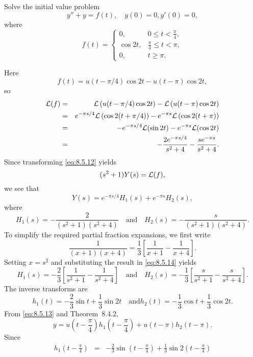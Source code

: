\documentclass{ximera}
\begin{document}
\begin{example}\label{example:8.5.4}
 Solve the initial value problem
\begin{equation}\label{eq:8.5.12}
y''+y=f(t), \quad   y(0)=0,  y'(0)=0,
\end{equation}
where
$$
f(t)=\left\{\begin{array}{cl}
 0,&0\leq t<\frac{\pi}{4},\\
\cos2t,&\frac{\pi}{4}\leq t<\pi,\\
 0,&t\geq\pi.
\end{array}\right.
$$
\begin{explanation}
Here
$$
f(t)=u(t-\pi/4)\cos2t-u(t-\pi)\cos2t,
$$
so
\begin{eqnarray*}
{\cal L}(f)&=&{\cal L}\left(u(t-\pi/4)\cos2t\right)-{\cal L}\left(u(t-\pi)\cos2t\right)\\
&=&e^{-{\pi s/4}}{\cal L}\left(\cos2(t+\pi/4)\right)-e^{-\pi s}{\cal L}\left(\cos2(t+\pi)\right)\\
&=&-e^{-{\pi s/4}}{\cal L}(\sin2t)-e^{-\pi s}
{\cal L}(\cos2t)\\
&=&-\frac{2e^{-{\pi s/ 4}}}{s^2+4}-\frac{se^{-\pi s}}{s^2+4}.
\end{eqnarray*}
Since transforming \eqref{eq:8.5.12} yields
$$
(s^2+1)Y(s)={\cal L}(f),
$$
we see that
\begin{equation}\label{eq:8.5.13}
Y(s)=e^{-{\pi s/ 4}} H_1(s)+e^{-\pi s} H_2(s),
\end{equation}
where
\begin{equation}\label{eq:8.5.14}
H_1(s)=-\frac{2}{(s^2+1)(s^2+4)}\quad\mbox{and}\quad H_2(s)=-\frac{s}{(s^2+1)(s^2+4)}.
\end{equation}
To simplify the required partial fraction expansions, we first write
$$
\frac{1}{(x+1)(x+4)}=\frac{1}{3}\left[\frac{1}{x+1}-\frac{1}{x+4}\right].
$$
Setting $x=s^2$ and substituting the result in  \eqref{eq:8.5.14} yields
$$
H_1(s)=-\frac{2}{3}\left[\frac{1}{s^2+1}-\frac{1}{s^2+4}\right]
\quad\mbox{and}\quad
H_2(s)=-\frac{1}{3}\left[\frac{s}{s^2+1}-\frac{s}{s^2+4}\right].
$$
The inverse transforms are
$$
h_1(t)=-\frac{2}{3}\sin t+\frac{1}{3}\sin2t
\quad\mbox{and}
h_2(t)=-\frac{1}{3}\cos t+\frac{1}{3}\cos2t.
$$
From  \eqref{eq:8.5.13} and Theorem~8.4.2,
\begin{equation}\label{eq:8.5.15}
y=u\left(t-\frac{\pi}{4}\right) h_1\left(t-\frac{\pi}{4}\right)+
u(t-\pi) h_2(t-\pi).
\end{equation}
Since
\begin{eqnarray*}
h_1\left(t-\frac{\pi}{4}\right)&=&-\frac{2}{3}\sin\left(t-\frac{\pi}{4}\right)+\frac{1}{3}\sin2\left(t-\frac{\pi}{4}\right)\\

\end{eqnarray*}
\end{explanation}
\end{example}
\end{document}

